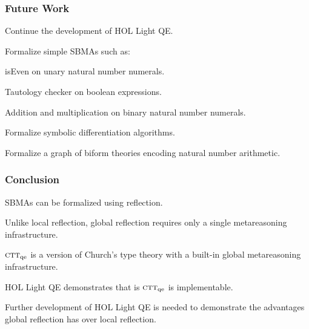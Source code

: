 \documentclass[t,12pt,numbers,fleqn]{beamer}
\newcommand{\churchqe}{$\mbox{\sc ctt}_{\rm qe}$}
\begin{document}
\begin{frame}
\frametitle{Future Work}
\bi

  \item Continue the development of HOL Light QE.

  \item Formalize simple SBMAs such as:

  \bi

    \item isEven on unary natural number numerals.

    \item Tautology checker on boolean expressions.

    \item Addition and multiplication on binary natural number
      numerals.

  \ei

  \item Formalize symbolic differentiation algorithms.

  \item Formalize a graph of biform theories encoding natural number
    arithmetic.

\ei
\end{frame}


\begin{frame}
\frametitle{Conclusion}
\be

  \item SBMAs can be formalized using reflection.

  \item Unlike local reflection, global reflection requires only a
    single metareasoning infrastructure.

  \item {\churchqe} is a version of Church's type theory with a
    built-in global metareasoning infrastructure.

  \item HOL Light QE demonstrates that is {\churchqe} is
    implementable.

  \item Further development of HOL Light QE is needed to demonstrate
    the advantages global reflection has over local reflection.

\ee
\end{frame}

\end{document}
